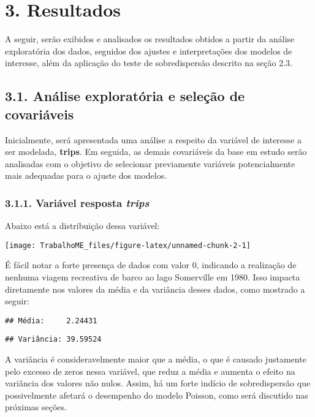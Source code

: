 \documentclass[
]{article}
\begin{document}
\section{3. Resultados}\label{resultados}

A seguir, serão exibidos e analisados os resultados obtidos a partir da
análise exploratória dos dados, seguidos dos ajustes e interpretações
dos modelos de interesse, além da aplicação do teste de sobredispersão
descrito na seção 2.3.

\subsection{3.1. Análise exploratória e seleção de
covariáveis}\label{anuxe1lise-exploratuxf3ria-e-seleuxe7uxe3o-de-covariuxe1veis}

Inicialmente, será apresentada uma análise a respeito da variável de
interesse a ser modelada, \textbf{trips}. Em seguida, as demais
covariáveis da base em estudo serão analisadas com o objetivo de
selecionar previamente variáveis potencialmente mais adequadas para o
ajuste dos modelos.

\subsubsection{\texorpdfstring{3.1.1. Variável resposta
\emph{trips}}{3.1.1. Variável resposta trips}}\label{variuxe1vel-resposta-trips}

Abaixo está a distribuição dessa variável:

\begin{center}\texttt{[image: TrabalhoME\_files/figure-latex/unnamed-chunk-2-1]} \end{center}

É fácil notar a forte presença de dados com valor \(0\), indicando a
realização de nenhuma viagem recreativa de barco ao lago Somerville em
1980. Isso impacta diretamente nos valores da média e da variância
desses dados, como mostrado a seguir:

\begin{verbatim}
## Média:     2.24431
\end{verbatim}

\begin{verbatim}
## Variância: 39.59524
\end{verbatim}

A variância é consideravelmente maior que a média, o que é causado
justamente pelo excesso de zeros nessa variável, que reduz a média e
aumenta o efeito na variância dos valores não nulos. Assim, há um forte
indício de sobredispersão que possivelmente afetará o desempenho do
modelo Poisson, como será discutido nas próximas seções.
\end{document}
